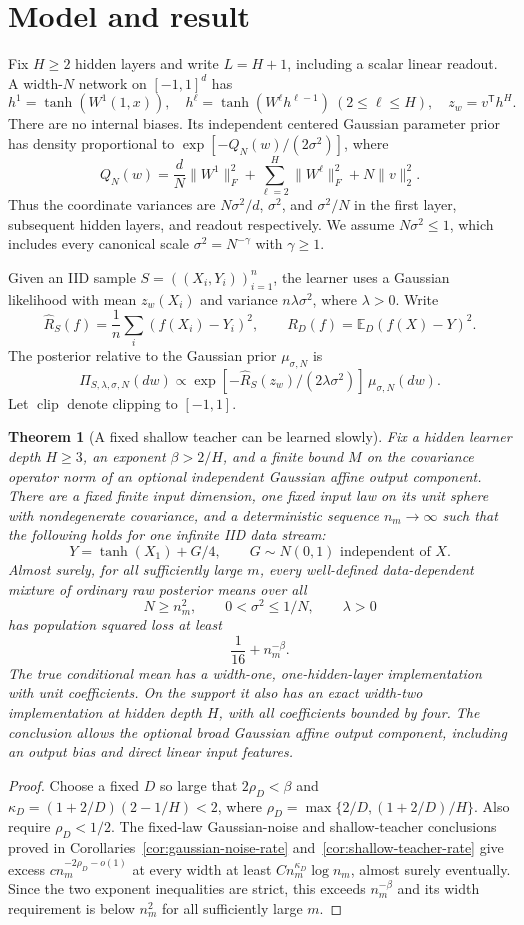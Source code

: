 \documentclass[11pt]{article}
\newtheorem{theorem}{Theorem}[section]
\newcommand{\E}{\mathbb E}\newcommand{\Pp}{\mathbb P}\newcommand{\R}{\mathbb R}
\newcommand{\clip}{\operatorname{clip}}\newcommand{\KL}{\operatorname{KL}}
\begin{document}
\section{Model and result}
Fix $H\ge2$ hidden layers and write $L=H+1$, including a scalar linear readout. A width-$N$ network on $[-1,1]^d$ has
\[
 h^1=\tanh(W^1(1,x)),\quad h^\ell=\tanh(W^\ell h^{\ell-1})\ (2\le\ell\le H),
 \quad z_w=v^{\mathsf T}h^H.
\]
There are no internal biases. Its independent centered Gaussian parameter prior has density proportional to $\exp[-Q_N(w)/(2\sigma^2)]$, where
\[
 Q_N(w)=\frac dN\|W^1\|_F^2+\sum_{\ell=2}^H\|W^\ell\|_F^2+N\|v\|_2^2.
\]
Thus the coordinate variances are $N\sigma^2/d$, $\sigma^2$, and $\sigma^2/N$ in the first layer, subsequent hidden layers, and readout respectively. We assume $N\sigma^2\le1$, which includes every canonical scale $\sigma^2=N^{-\gamma}$ with $\gamma\ge1$.

Given an IID sample $S=((X_i,Y_i))_{i=1}^n$, the learner uses a Gaussian likelihood with mean $z_w(X_i)$ and variance $n\lambda\sigma^2$, where $\lambda>0$. Write
\[
 \widehat R_S(f)=\frac1n\sum_i(f(X_i)-Y_i)^2,\qquad R_D(f)=\E_D(f(X)-Y)^2.
\]
The posterior relative to the Gaussian prior $\mu_{\sigma,N}$ is
\[
 \Pi_{S,\lambda,\sigma,N}(dw)\propto
 \exp[-\widehat R_S(z_w)/(2\lambda\sigma^2)]\,\mu_{\sigma,N}(dw).
\]
Let $\clip$ denote clipping to $[-1,1]$.

\begin{theorem}[A fixed shallow teacher can be learned slowly]
\label{thm:main-slow}
Fix a hidden learner depth $H\ge3$, an exponent $\beta>2/H$, and a finite bound $M$ on the covariance operator norm of an optional independent Gaussian affine output component. There are a fixed finite input dimension, one fixed input law on its unit sphere with nondegenerate covariance, and a deterministic sequence $n_m\to\infty$ such that the following holds for one infinite IID data stream:
\[
 Y=\tanh(X_1)+G/4,\qquad G\sim N(0,1)\text{ independent of }X.
\]
Almost surely, for all sufficiently large $m$, every well-defined data-dependent mixture of ordinary raw posterior means over all
\[
 N\ge n_m^2,\qquad 0<\sigma^2\le1/N,\qquad \lambda>0
\]
has population squared loss at least
\[
 \frac1{16}+n_m^{-\beta}.
\]
The true conditional mean has a width-one, one-hidden-layer implementation with unit coefficients. On the support it also has an exact width-two implementation at hidden depth $H$, with all coefficients bounded by four. The conclusion allows the optional broad Gaussian affine output component, including an output bias and direct linear input features.
\end{theorem}
\begin{proof}
Choose a fixed $D$ so large that $2\rho_D<\beta$ and
$\kappa_D=(1+2/D)(2-1/H)<2$, where
$\rho_D=\max\{2/D,(1+2/D)/H\}$. Also require $\rho_D<1/2$.
The fixed-law Gaussian-noise and shallow-teacher conclusions proved in Corollaries~\ref{cor:gaussian-noise-rate} and~\ref{cor:shallow-teacher-rate} give excess
$c n_m^{-2\rho_D-o(1)}$ at every width at least $C n_m^{\kappa_D}\log n_m$, almost surely eventually. Since the two exponent inequalities are strict, this exceeds $n_m^{-\beta}$ and its width requirement is below $n_m^2$ for all sufficiently large $m$.
\end{proof}
\end{document}
